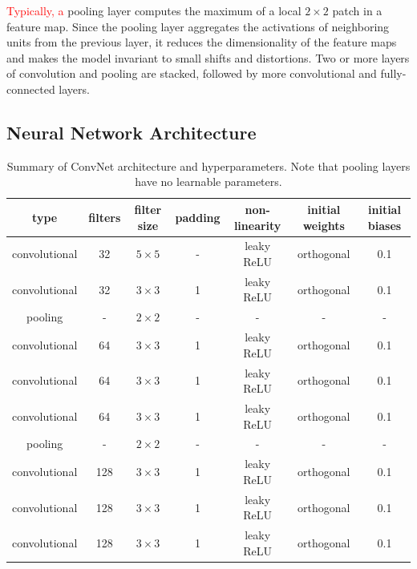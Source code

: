 \documentclass[fleqn,usenatbib]{mnras}
\newcommand{\changed}[1]{\textcolor{red}{#1}}
\begin{document}
\changed{
Typically, a
}
pooling layer computes the maximum of a local $2\times2$ patch in a feature map.
Since the pooling layer aggregates the activations of neighboring units from the previous layer,
it reduces the dimensionality of the feature maps and
makes the model invariant to small shifts and distortions.
Two or more layers of convolution and pooling are stacked,
followed by more convolutional and fully-connected layers.

\subsection{Neural Network Architecture}

\begin{table}
  \centering
  \caption{Summary of ConvNet architecture and hyperparameters. Note that pooling layers have no learnable parameters.}
  \label{table:hyperparamters}
  \begin{tabular}{ccccccc}
    \hline
    type            & filters & filter size & padding & non-linearity & initial weights & initial biases \\
    \hline
    convolutional   & 32          & $5\times5$  & -       & leaky ReLU    & orthogonal      & 0.1            \\
    convolutional   & 32          & $3\times3$  & 1       & leaky ReLU    & orthogonal      & 0.1            \\
    pooling         & -           & $2\times2$  & -       & -             & -               & -              \\
    convolutional   & 64          & $3\times3$  & 1       & leaky ReLU    & orthogonal      & 0.1            \\
    convolutional   & 64          & $3\times3$  & 1       & leaky ReLU    & orthogonal      & 0.1            \\
    convolutional   & 64          & $3\times3$  & 1       & leaky ReLU    & orthogonal      & 0.1            \\
    pooling         & -           & $2\times2$  & -       & -             & -               & -              \\
    convolutional   & 128         & $3\times3$  & 1       & leaky ReLU    & orthogonal      & 0.1            \\
    convolutional   & 128         & $3\times3$  & 1       & leaky ReLU    & orthogonal      & 0.1            \\
    convolutional   & 128         & $3\times3$  & 1       & leaky ReLU    & orthogonal      & 0.1            \\

\end{tabular}
\end{table}
\end{document}
